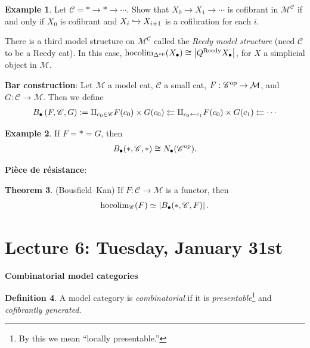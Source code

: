 \documentclass[12pt]{amsart}
\theoremstyle{definition}
\newtheorem{theorem}{Theorem}[section]
\newtheorem{definition}[theorem]{Definition}
\newtheorem{example}[theorem]{Example}
\begin{document}
\begin{example} Let $\mathscr{C} = \ast \to \ast \to \cdots$. Show that $X_0 \to X_1 \to \cdots $ is cofibrant in $\mathcal{M}^{\mathscr{C}}$ if and only if $X_0$ is cofibrant and $X_i \xhookrightarrow{} X_{i+1}$ is a cofibration for each $i$.
\end{example}

There is a third model structure on $\mathcal{M}^{\mathscr{C}}$ called the \textit{Reedy model structure} (need $\mathscr{C}$ to be a Reedy cat). In this case, $\text{hocolim}_{\Delta^{\text{op}}}(X_\bullet) \cong \left| Q^\text{Reedy} X_\bullet \right|$, for $X$ a simplicial object in $\mathcal{M}$.

\textbf{Bar construction}: Let $\mathcal{M}$ a model cat, $\mathscr{C}$ a small cat, $F: \mathscr{C}^{\text{op}} \to \mathcal{M}$, and $G : \mathscr{C} \to \mathcal{M}$. Then we define
\begin{align*}
    B_\bullet \left( F, \mathscr{C}, G \right) := \amalg_{c_0 \in \mathscr{C}} F(c_0) \times G(c_0) \leftleftarrows \amalg_{c_0 \leftarrow c_1} F(c_0) \times G(c_1) \leftleftarrows \cdots 
\end{align*}

\begin{example} If $F = \ast = G$, then
\begin{align*}
    B_\bullet(\ast,\mathscr{C},\ast) \cong N_\bullet(\mathscr{C}^{\text{op}}).
\end{align*}
\end{example}

\textbf{Pi\`ece de r\'esistance}:

\begin{theorem} (Bousfield--Kan) If $F: \mathscr{C} \to \mathcal{M}$ is a functor, then
\begin{align*}
    \text{hocolim}_\mathscr{C}(F) \simeq \left| B_\bullet(\ast,\mathscr{C},F) \right|.
\end{align*}
\end{theorem}


\section{Lecture 6: Tuesday, January 31st}

\begin{center}
    \textbf{Combinatorial model categories}
\end{center}

\begin{definition} A model category is \textit{combinatorial} if it is \textit{presentable}\footnote{By this we mean ``locally presentable.''} and \textit{cofibrantly generated}.
\end{definition}
\end{document}
